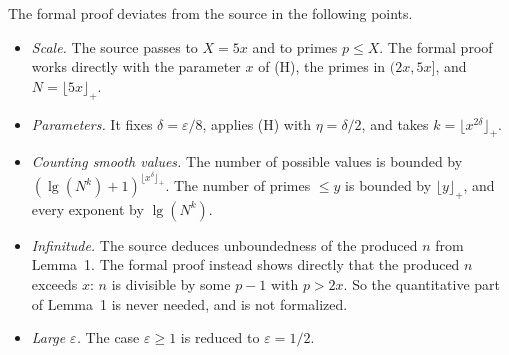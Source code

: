 \documentclass[11pt]{article}
\theoremstyle{definition}
\theoremstyle{remark}
\newcommand{\nfl}[1]{\lfloor #1\rfloor_{+}}
\DeclareMathOperator{\lgt}{lg}
\begin{document}
The formal proof deviates from the source in the following points.
\begin{itemize}
\item \emph{Scale.} The source passes to $X=5x$ and to primes $p\le X$. The formal proof works directly with the parameter $x$ of (H), the primes in $(2x,5x]$, and $N=\nfl{5x}$.
\item \emph{Parameters.} It fixes $\delta=\varepsilon/8$, applies (H) with $\eta=\delta/2$, and takes $k=\nfl{x^{2\delta}}$.
\item \emph{Counting smooth values.} The number of possible values is bounded by $(\lgt(N^k)+1)^{\nfl{x^\delta}}$. The number of primes $\le y$ is bounded by $\nfl{y}$, and every exponent by $\lgt(N^k)$.
\item \emph{Infinitude.} The source deduces unboundedness of the produced $n$ from Lemma~1. The formal proof instead shows directly that the produced $n$ exceeds $x$: $n$ is divisible by some $p-1$ with $p>2x$. So the quantitative part of Lemma~1 is never needed, and is not formalized.
\item \emph{Large $\varepsilon$.} The case $\varepsilon\ge1$ is reduced to $\varepsilon=1/2$.
\end{itemize}
\end{document}
